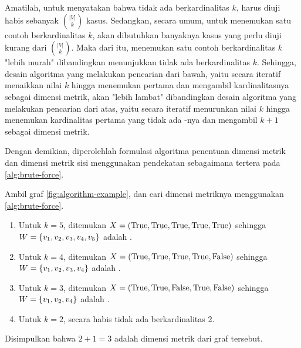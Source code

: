 Amatilah, untuk menyatakan bahwa tidak ada  berkardinalitas \(k\), harus diuji habis sebanyak \(\binom{|V|}{k}\) kasus. Sedangkan, secara umum, untuk menemukan satu contoh  berkardinalitas \(k\), akan dibutuhkan banyaknya kasus yang perlu diuji kurang dari \(\binom{|V|}{k}\). Maka dari itu, menemukan satu contoh  berkardinalitas \(k\) "lebih murah" dibandingkan menunjukkan tidak ada  berkardinalitas \(k\). Sehingga, desain algoritma yang melakukan pencarian dari bawah, yaitu secara iteratif menaikkan nilai \(k\) hingga menemukan  pertama dan mengambil kardinalitasnya sebagai dimensi metrik, akan "lebih lambat" dibandingkan desain algoritma yang melakukan pencarian dari atas, yaitu secara iteratif menurunkan nilai \(k\) hingga menemukan kardinalitas pertama yang tidak ada -nya dan mengambil \(k + 1\) sebagai dimensi metrik.

Dengan demikian, diperolehlah formulasi algoritma penentuan dimensi metrik dan dimensi metrik sisi menggunakan pendekatan  sebagaimana tertera pada \autoref{alg:brute-force}.

\begin{example}
	Ambil graf \autoref{fig:algorithm-example}, dan cari dimensi metriknya menggunakan \autoref{alg:brute-force}.
	\begin{enumerate}
		\item Untuk \(k = 5\), ditemukan \(X = (\mathrm{True}, \mathrm{True}, \mathrm{True}, \mathrm{True}, \mathrm{True})\) sehingga \(W = \{v_1, v_2,\\ v_3, v_4, v_5\}\) adalah .
		\item Untuk \(k = 4\), ditemukan \(X = (\mathrm{True}, \mathrm{True}, \mathrm{True}, \mathrm{True}, \mathrm{False})\) sehingga \(W = \{v_1, v_2,\\ v_3, v_4\}\) adalah .
		\item Untuk \(k = 3\), ditemukan \(X = (\mathrm{True}, \mathrm{True}, \mathrm{False}, \mathrm{True}, \mathrm{False})\) sehingga \(W = \{v_1, v_2,\\ v_4\}\) adalah .
		\item Untuk \(k = 2\), secara habis tidak ada  berkardinalitas 2.
	\end{enumerate}
	Disimpulkan bahwa \(2 + 1 = 3\) adalah dimensi metrik dari graf tersebut.
\end{example}

\subsection{}
\label{subsec:bs}

